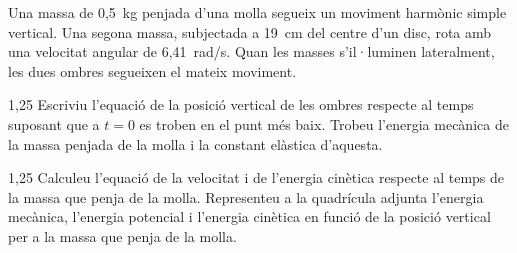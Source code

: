 Una massa de 0,5~kg penjada d'una molla segueix un moviment harmònic simple vertical. Una segona massa, subjectada a 19~cm del centre d'un disc, rota amb una velocitat angular de 6,41~rad/s. Quan les masses s'il·luminen lateralment, les dues ombres segueixen el mateix moviment.


\begin{apartat}{1,25}
Escriviu l'equació de la posició vertical de les ombres respecte al temps suposant que a $t = 0$ es troben en el punt més baix. Trobeu l'energia mecànica de la massa penjada de la molla i la constant elàstica d'aquesta.
\end{apartat}

\begin{apartat}{1,25}
Calculeu l'equació de la velocitat i de l'energia cinètica respecte al temps de la massa que penja de la molla. Representeu a la quadrícula adjunta l'energia mecànica, l'energia potencial i l'energia cinètica en funció de la posició vertical per a la massa que penja de la molla.
\end{apartat}

